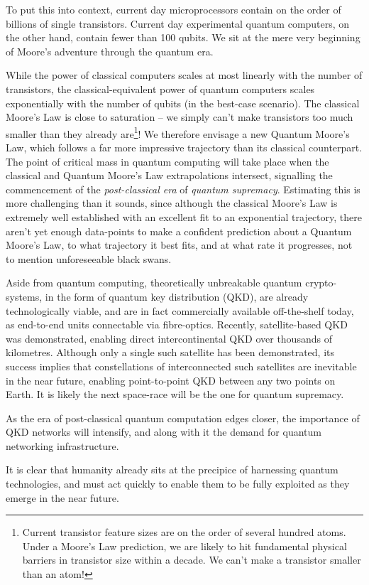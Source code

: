 To put this into context, current day microprocessors contain on the order of billions of single transistors. Current day  experimental quantum computers, on the other hand, contain fewer than 100 qubits. We sit at the mere very beginning of Moore's adventure through the quantum era.

While the power of classical computers scales at most linearly with the number of transistors, the classical-equivalent power of quantum computers scales exponentially with the number of qubits (in the best-case scenario). The classical Moore's Law is close to saturation -- we simply can't make transistors too much smaller than they already are\footnote{Current transistor feature sizes are on the order of several hundred atoms. Under a Moore's Law prediction, we are likely to hit fundamental physical barriers in transistor size within a decade. We can't make a transistor smaller than an atom!}! We therefore envisage a new Quantum Moore's Law, which follows a far more impressive trajectory than its classical counterpart. The point of critical mass in quantum computing will take place when the classical and Quantum Moore's Law extrapolations intersect, signalling the commencement of the \textit{post-classical era} of \textit{quantum supremacy}. Estimating this is more challenging than it sounds, since although the classical Moore's Law is extremely well established with an excellent fit to an exponential trajectory, there aren't yet enough data-points to make a confident prediction about a Quantum Moore's Law, to what trajectory it best fits, and at what rate it progresses, not to mention unforeseeable black swans.

Aside from quantum computing, theoretically unbreakable quantum crypto-systems, in the form of quantum key distribution (QKD), are already technologically viable, and are in fact commercially available off-the-shelf today, as end-to-end units connectable via fibre-optics. Recently, satellite-based QKD was demonstrated, enabling direct intercontinental QKD over thousands of kilometres. Although only a single such satellite has been demonstrated, its success implies that constellations of interconnected such satellites are inevitable in the near future, enabling point-to-point QKD between any two points on Earth. It is likely the next space-race will be the one for quantum supremacy.

As the era of post-classical quantum computation edges closer, the importance of QKD networks will intensify, and along with it the demand for quantum networking infrastructure.

It is clear that humanity already sits at the precipice of harnessing quantum technologies, and must act quickly to enable them to be fully exploited as they emerge in the near future.